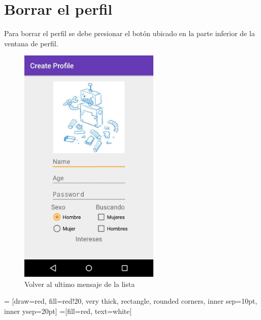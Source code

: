 \documentclass[10pt,letterpaper,extrafontsizes]{memoir}
\begin{document}
\section{Borrar el perfil}

Para borrar el perfil se debe presionar el botón ubicado en la parte inferior de la ventana de perfil.

\begin{figure}[H]
    \centering
\includegraphics[width=0.6\textwidth]{graficos/capturas/i}
    \caption{Volver al ultimo mensaje de la lista}
    \label{fig:chatDown}
\end{figure}

\begin{center}
 = [draw=red, fill=red!20, very thick,
    rectangle, rounded corners, inner sep=10pt, inner ysep=20pt]
 =[fill=red, text=white]
\end{center}
%
\end{document}
